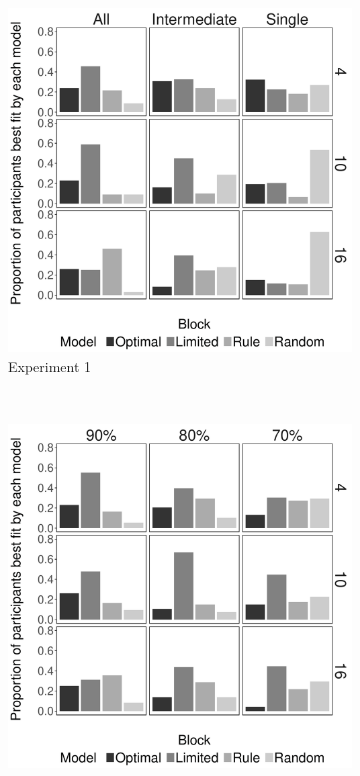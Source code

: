 \documentclass[a4paper, doc, floatsintext]{apa6}
\begin{document}
\begin{figure}
\begin{subfigure}[b]{0.45\textwidth}
      \includegraphics[width=\textwidth]{figures/individual-model-prop-by-structure-and-dim-experiment-one.pdf}
      \caption{Experiment 1}
    \end{subfigure}
    ~
    \begin{subfigure}[b]{0.45\textwidth}
\includegraphics[width=\textwidth]{figures/individual-model-prop-by-structure-and-dim-experiment-two.pdf}

\end{subfigure}
\end{figure}
\end{document}

